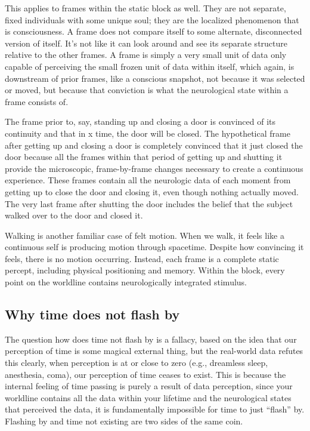 \documentclass[11pt,a4paper]{article}
\begin{document}
This applies to frames within the static block as well. They are not separate, fixed individuals with some unique soul; they are the localized phenomenon that is consciousness. A frame does not compare itself to some alternate, disconnected version of itself. It’s not like it can look around and see its separate structure relative to the other frames. A frame is simply a very small unit of data only capable of perceiving the small frozen unit of data within itself, which again, is downstream of prior frames, like a conscious snapshot, not because it was selected or moved, but because that conviction is what the neurological state within a frame consists of.

The frame prior to, say, standing up and closing a door is convinced of its continuity and that in x time, the door will be closed. The hypothetical frame after getting up and closing a door is completely convinced that it just closed the door because all the frames within that period of getting up and shutting it provide the microscopic, frame-by-frame changes necessary to create a continuous experience. These frames contain all the neurologic data of each moment from getting up to close the door and closing it, even though nothing actually moved. The very last frame after shutting the door includes the belief that the subject walked over to the door and closed it.

Walking is another familiar case of felt motion. When we walk, it feels like a continuous self is producing motion through spacetime. Despite how convincing it feels, there is no motion occurring. Instead, each frame is a complete static percept, including physical positioning and memory. Within the block, every point on the worldline contains neurologically integrated stimulus.

\subsection{Why time does not flash by}

The question how does time not flash by is a fallacy, based on the idea that our perception of time is some magical external thing, but the real-world data refutes this clearly, when perception is at or close to zero (e.g., dreamless sleep, anesthesia, coma), our perception of time ceases to exist. This is because the internal feeling of time passing is purely a result of data perception, since your worldline contains all the data within your lifetime and the neurological states that perceived the data, it is fundamentally impossible for time to just ``flash'' by. Flashing by and time not existing are two sides of the same coin.
\end{document}
